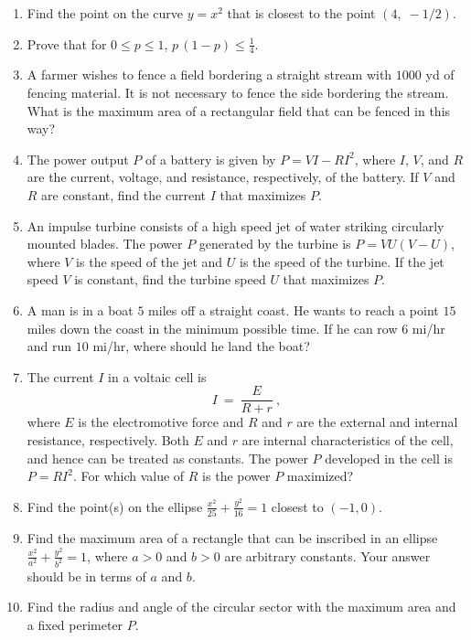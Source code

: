 \startexercises\label{sec4dot1}
{\small
{}
\begin{enumerate}[\bfseries 1.]
 \item Find the point on the curve $y=x^2$ that is closest to the point $(4,\;-1/2)$.
 \item Prove that for $0\le p\le 1$, $p\,(1-p) \le \frac{1}{4}$.
 \item A farmer wishes to fence a field bordering a straight stream with $1000$
  yd of fencing material. It is not necessary to fence the side bordering the
  stream. What is the maximum area of a rectangular field that can be fenced in
  this way?
 \item The power output $P$ of a battery is given by $P = VI - RI^2$, where $I$,
  $V$, and $R$ are the current, voltage, and resistance, respectively, of the
  battery. If $V$ and $R$ are constant, find the current $I$ that maximizes $P$.
 \item An impulse turbine consists of a high speed jet of water striking
  circularly mounted blades. The power $P$ generated by the turbine is
  $P=VU(V-U)$, where $V$ is the speed of the jet and $U$ is the speed of the
  turbine. If the jet speed $V$ is constant, find the turbine speed $U$ that
  maximizes $P$.
 \item A man is in a boat $5$ miles off a straight coast. He wants to reach a
  point $15$ miles down the coast in the minimum possible time. If he can row
  $6$ mi/hr and run $10$ mi/hr, where should he land the boat?
 \item The current $I$ in a voltaic cell is
 \begin{displaymath}
  I ~=~ \dfrac{E}{R + r} ~,
 \end{displaymath}
 where $E$ is the electromotive force and $R$ and $r$ are the external and
 internal resistance, respectively. Both $E$ and $r$ are internal
 characteristics of the cell, and hence can be treated as constants. The power
 $P$ developed in the cell is $P = RI^2$. For which value of $R$ is the power
 $P$ maximized?
 \item Find the point(s) on the ellipse $\frac{x^2}{25} + \frac{y^2}{16} = 1$
  closest to $(-1,0)$.
 \item Find the maximum area of a rectangle that can be inscribed in an ellipse
  $\frac{x^2}{a^2} + \frac{y^2}{b^2} = 1$, where $a>0$ and $b>0$ are arbitrary
  constants. Your answer should be in terms of $a$ and $b$.
 \item Find the radius and angle of the circular sector with the maximum
  area and a fixed perimeter $P$.

\end{enumerate}}
